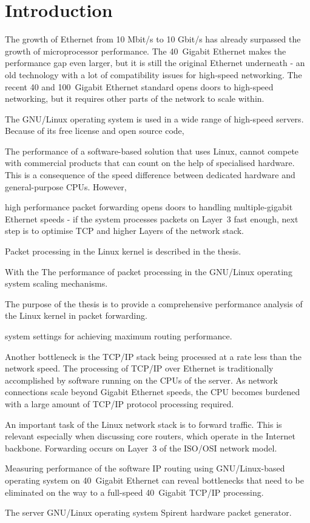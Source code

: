 
\chapter{Introduction}
The growth of Ethernet from 10 Mbit/s to 10 Gbit/s has already surpassed
the growth of microprocessor performance.
The 40~Gigabit Ethernet makes the performance gap even larger, but
it is still the original Ethernet underneath - an old technology
with a lot of compatibility issues for high-speed networking.
The recent 40 and 100~Gigabit Ethernet standard opens doors to
high-speed networking, but it requires other parts of the network to scale within.

The GNU/Linux operating system is used in a wide range of high-speed servers.
Because of its free license and open source code,


The performance of a software-based solution that uses Linux, cannot compete
with commercial products that can count on the help of specialised hardware.
This is a consequence of the speed difference between dedicated hardware and general-purpose CPUs.
However,

high performance packet forwarding opens doors to handling multiple-gigabit Ethernet speeds -
if the system processes packets on Layer~3 fast enough,
next step is to optimise TCP and higher Layers of the network stack.

Packet processing in the Linux kernel is described in the thesis.

With the 
The performance of packet processing in the GNU/Linux operating
system 
scaling mechanisms.


The purpose of the thesis
is to provide a comprehensive performance analysis of the Linux kernel
in packet forwarding.

system settings for achieving maximum routing performance.


Another bottleneck is the TCP/IP stack being processed at a rate less than the network speed.
The processing of TCP/IP over Ethernet is traditionally accomplished by software running on the CPUs of the server.
As network connections scale beyond Gigabit Ethernet speeds,
the CPU becomes burdened with a large amount of TCP/IP protocol processing required.


An important task of the Linux network stack is to forward traffic.
This is relevant especially when discussing core routers, which operate in the Internet backbone.
Forwarding occurs on Layer~3 of the ISO/OSI network model.

Measuring performance of the software IP routing using GNU/Linux-based operating system on 40~Gigabit Ethernet
can reveal bottlenecks that need to be eliminated
on the way to a full-speed 40~Gigabit TCP/IP processing.

The server GNU/Linux operating system
Spirent hardware packet generator.

